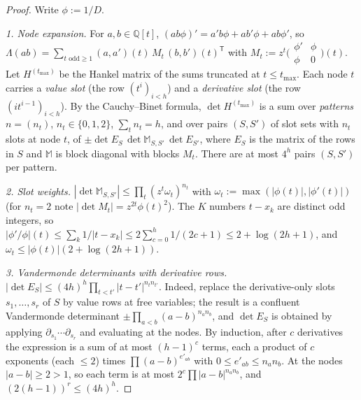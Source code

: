 \documentclass[11pt]{amsart}
\theoremstyle{definition}
\theoremstyle{remark}
\numberwithin{equation}{section}
\newcommand{\QQ}{\mathbb{Q}}
\begin{document}
\begin{proof}
Write $\phi:=1/D$.

\emph{1. Node expansion.} For $a,b\in\QQ[t]$, $(ab\phi)'=a'b\phi+ab'\phi+ab\phi'$, so
$\Lambda(ab)=\sum_{t\text{ odd}\ge1}(a,a')(t)\,M_t\,(b,b')(t)^{\mathsf T}$ with
$M_t:=z^t\bigl(\begin{smallmatrix}\phi'&\phi\\\phi&0\end{smallmatrix}\bigr)(t)$. Let $H^{(t_{\max})}$ be the Hankel matrix of
the sums truncated at $t\le t_{\max}$. Each node $t$ carries a \emph{value slot} (the row $(t^i)_{i<h}$) and a
\emph{derivative slot} (the row $(it^{i-1})_{i<h}$). By the Cauchy--Binet formula, $\det H^{(t_{\max})}$ is a sum over
\emph{patterns} $n=(n_t)$, $n_t\in\{0,1,2\}$, $\sum_tn_t=h$, and over pairs $(S,S')$ of slot sets with $n_t$ slots at
node $t$, of $\pm\det E_S\,\det\mathbb M_{S,S'}\,\det E_{S'}$, where $E_S$ is the matrix of the rows in $S$ and
$\mathbb M$ is block diagonal with blocks $M_t$. There are at most $4^h$ pairs $(S,S')$ per pattern.

\emph{2. Slot weights.} $|\det\mathbb M_{S,S'}|\le\prod_t(z^t\omega_t)^{n_t}$ with $\omega_t:=\max(|\phi(t)|,|\phi'(t)|)$
(for $n_t=2$ note $|\det M_t|=z^{2t}\phi(t)^2$). The $K$ numbers $t-x_k$ are distinct odd integers, so
$|\phi'/\phi|(t)\le\sum_k1/|t-x_k|\le2\sum_{c=0}^h1/(2c+1)\le2+\log(2h+1)$, and $\omega_t\le|\phi(t)|(2+\log(2h+1))$.

\emph{3. Vandermonde determinants with derivative rows.} $|\det E_S|\le(4h)^h\prod_{t<t'}|t-t'|^{n_tn_{t'}}$. Indeed,
replace the derivative-only slots $s_1,\dots,s_r$ of $S$ by value rows at free variables; the result is a confluent
Vandermonde determinant $\pm\prod_{a<b}(a-b)^{n_an_b}$, and $\det E_S$ is obtained by applying
$\partial_{s_1}\cdots\partial_{s_r}$ and evaluating at the nodes. By induction, after $c$ derivatives the expression is a sum
of at most $(h-1)^c$ terms, each a product of $c$ exponents (each $\le2$) times $\prod(a-b)^{e'_{ab}}$ with
$0\le e'_{ab}\le n_an_b$. At the nodes $|a-b|\ge2>1$, so each term is at most $2^c\prod|a-b|^{n_an_b}$, and
$(2(h-1))^r\le(4h)^h$.


\end{proof}
\end{document}
